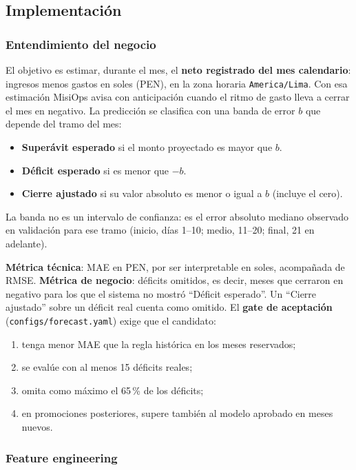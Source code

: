 \subsection{Implementación}

\subsubsection{Entendimiento del negocio}

El objetivo es estimar, durante el mes, el \textbf{neto registrado del mes calendario}: ingresos menos gastos en soles (PEN), en la zona horaria \texttt{America/Lima}. Con esa estimación MisiOps avisa con anticipación cuando el ritmo de gasto lleva a cerrar el mes en negativo. La predicción se clasifica con una banda de error $b$ que depende del tramo del mes:

\begin{itemize}
    \item \textbf{Superávit esperado} si el monto proyectado es mayor que $b$.
    \item \textbf{Déficit esperado} si es menor que $-b$.
    \item \textbf{Cierre ajustado} si su valor absoluto es menor o igual a $b$ (incluye el cero).
\end{itemize}

La banda no es un intervalo de confianza: es el error absoluto mediano observado en validación para ese tramo (inicio, días 1--10; medio, 11--20; final, 21 en adelante).

\textbf{Métrica técnica}: MAE en PEN, por ser interpretable en soles, acompañada de RMSE. \textbf{Métrica de negocio}: déficits omitidos, es decir, meses que cerraron en negativo para los que el sistema no mostró ``Déficit esperado''. Un ``Cierre ajustado'' sobre un déficit real cuenta como omitido. El \textbf{gate de aceptación} (\texttt{configs/forecast.yaml}) exige que el candidato:
\begin{enumerate}
    \item tenga menor MAE que la regla histórica en los meses reservados;
    \item se evalúe con al menos 15 déficits reales;
    \item omita como máximo el 65\,\% de los déficits;
    \item en promociones posteriores, supere también al modelo aprobado en meses nuevos.
\end{enumerate}

\subsubsection{Feature engineering}

